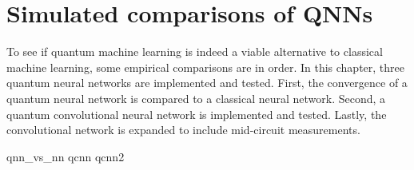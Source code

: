 \chapter{Simulated comparisons of QNNs}
\label{chap:comparison}

To see if quantum machine learning is indeed a viable alternative to classical machine learning, some empirical comparisons are in order.
In this chapter, three quantum neural networks are implemented and tested.
First, the convergence of a quantum neural network is compared to a classical neural network.
Second, a quantum convolutional neural network is implemented and tested.
Lastly, the convolutional network is expanded to include mid-circuit measurements.

{qnn_vs_nn}
{qcnn}
{qcnn2}
